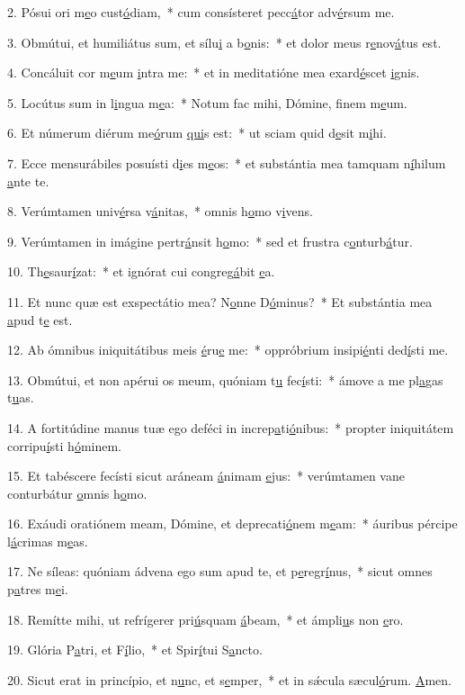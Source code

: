 2. Pósui ori m\uline{e}o cust\uline{ó}diam,~* cum consísteret pecc\uline{á}tor adv\uline{é}rsum me.\par 
3. Obmútui, et humiliátus sum, et sílu\uline{i} a b\uline{o}nis:~* et dolor meus r\uline{e}nov\uline{á}tus est.\par 
4. Concáluit cor m\uline{e}um \uline{i}ntra me:~* et in meditatióne mea exard\uline{é}scet \uline{i}gnis.\par 
5. Locútus sum in l\uline{i}ngua m\uline{e}a:~* Notum fac mihi, Dómine, f\uline{i}nem m\uline{e}um.\par 
6. Et númerum diérum me\uline{ó}rum \uline{qui}s est:~* ut sciam quid d\uline{e}sit m\uline{i}hi.\par 
7. Ecce mensurábiles posuísti d\uline{i}es m\uline{e}os:~* et substántia mea tamquam n\uline{í}hilum \uline{a}nte te.\par 
8. Verúmtamen univ\uline{é}rsa v\uline{á}nitas,~* omnis h\uline{o}mo v\uline{i}vens.\par 
9. Verúmtamen in imágine pertr\uline{á}nsit h\uline{o}mo:~* sed et frustra c\uline{o}nturb\uline{á}tur.\par 
10. Th\uline{e}saur\uline{í}zat:~* et ignórat cui congreg\uline{á}bit \uline{e}a.\par 
11. Et nunc quæ est exspectátio mea? N\uline{o}nne D\uline{ó}minus?~* Et substántia mea \uline{a}pud t\uline{e} est.\par 
12. Ab ómnibus iniquitátibus meis \uline{é}ru\uline{e} me:~* oppróbrium insipi\uline{é}nti ded\uline{í}sti me.\par 
13. Obmútui, et non apérui os meum, quóniam t\uline{u} fec\uline{í}sti:~* ámove a me pl\uline{a}gas t\uline{u}as.\par 
14. A fortitúdine manus tuæ ego deféci in increp\uline{a}ti\uline{ó}nibus:~* propter iniquitátem corripu\uline{í}sti h\uline{ó}minem.\par 
15. Et tabéscere fecísti sicut aráneam \uline{á}nimam \uline{e}jus:~* verúmtamen vane conturbátur \uline{o}mnis h\uline{o}mo.\par 
16. Exáudi oratiónem meam, Dómine, et deprecati\uline{ó}nem m\uline{e}am:~* áuribus pércipe l\uline{á}crimas m\uline{e}as.\par 
17. Ne síleas: quóniam ádvena ego sum apud te, et p\uline{e}regr\uline{í}nus,~* sicut omnes p\uline{a}tres m\uline{e}i.\par 
18. Remítte mihi, ut refrígerer pri\uline{ú}squam \uline{á}beam,~* et ámpli\uline{u}s non \uline{e}ro.\par 
19. Glória P\uline{a}tri, et F\uline{í}lio,~* et Spir\uline{í}tui S\uline{a}ncto.\par 
20. Sicut erat in princípio, et n\uline{u}nc, et s\uline{e}mper,~* et in sǽcula sæcul\uline{ó}rum. \uline{A}men.\par 
